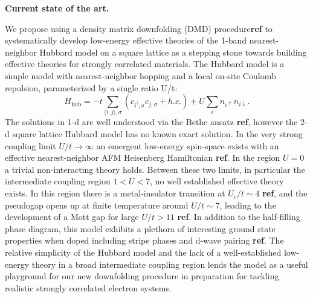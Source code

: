 \documentclass{article}
\begin{document}
\textbf{Current state of the art.}

We propose using a density matrix downfolding (DMD) procedure\textbf{ref} to systematically develop low-energy effective theories of the 1-band nearest-neighbor Hubbard model on a square lattice as a stepping stone towards building effective theories for strongly correlated materials. The Hubbard model is a simple model with nearest-neighbor hopping and a local on-site Coulomb repulsion, parameterized by a single ratio U/t: 
\begin{equation}
H_\text{hub} = -t \sum_{\langle i,j \rangle,\sigma}( c_{i^\dagger,\sigma} c_{j,\sigma} + h.c.) + U \sum_i n_{i\uparrow} n_{i\downarrow}
\label{hubbard}.
\end{equation}
The solutions in 1-d are well understood via the Bethe ansatz \textbf{ref}, however the 2-d square lattice Hubbard model has no known exact solution.  In the very strong coupling limit $U/t \rightarrow \infty$ an emergent low-energy spin-space exists with an effective nearest-neighbor AFM Heisenberg Hamiltonian \textbf{ref}. In the region $U = 0$ a trivial non-interacting theory holds. Between these two limits, in particular the intermediate coupling region $1 < U < 7$, no well established effective theory exists. In this region there is a metal-insulator transition at $U_c/t \sim 4$ \textbf{ref}, and the pseudogap opens up at finite temperature around $U/t \sim 7$, leading to the development of a Mott gap for large $U/t > 11$ \textbf{ref}. In addition to the half-filling phase diagram, this model exhibits a plethora of interesting ground state properties when doped including stripe phases and d-wave pairing \textbf{ref}. The relative simplicity of the Hubbard model and the lack of a well-established low-energy theory in a broad intermediate coupling region lends the model as a useful playground for our new downfolding procedure in preparation for tackling realistic strongly correlated electron systems. 
\end{document}
